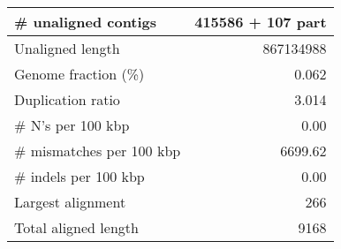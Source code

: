 \documentclass[12pt,a4paper]{article}
\begin{document}
\begin{table}[ht]
\begin{center}
\begin{tabular}{|l*{1}{|r}|}
\# unaligned contigs & 415586 + 107 part \\ \hline
Unaligned length & 867134988 \\ \hline
Genome fraction (\%) & 0.062 \\ \hline
Duplication ratio & 3.014 \\ \hline
\# N's per 100 kbp & 0.00 \\ \hline
\# mismatches per 100 kbp & 6699.62 \\ \hline
\# indels per 100 kbp & 0.00 \\ \hline
Largest alignment & 266 \\ \hline
Total aligned length & 9168 \\ \hline
\end{tabular}
\end{center}
\end{table}
\end{document}
